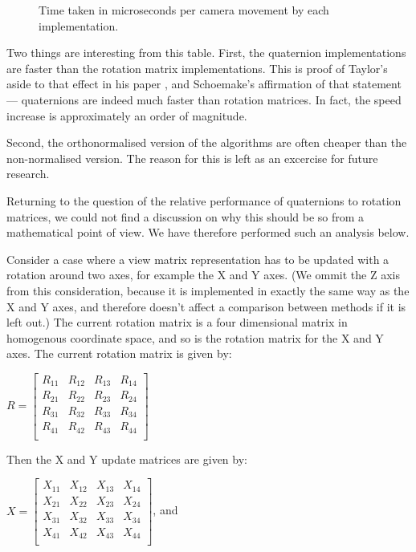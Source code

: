 \documentclass{acm_proc_article-sp}
\begin{document}
\begin{figure}
\caption{Time taken in microseconds per camera movement by each implementation.}
\label{fig:performance-table}
\end{figure}

Two things are interesting from this table.
First, the quaternion implementations are faster than the rotation matrix implementations.
This is proof of Taylor's aside to that effect in his paper \cite{taylor79}, and Schoemake's affirmation of that statement \cite{schoemake85} --- quaternions are indeed much faster than rotation matrices.
In fact, the speed increase is approximately an order of magnitude.

Second, the orthonormalised version of the algorithms are often cheaper than the non-normalised version.
The reason for this is left as an excercise for future research.

Returning to the question of the relative performance of quaternions to rotation matrices, we could not find a discussion on why this should be so from a mathematical point of view.
We have therefore performed such an analysis below.

Consider a case where a view matrix representation has to be updated with a rotation around two axes, for example the X and Y axes.
(We ommit the Z axis from this consideration, because it is implemented in exactly the same way as the X and Y axes, and therefore doesn't affect a comparison between methods if it is left out.)
The current rotation matrix is a four dimensional matrix in homogenous coordinate space, and so is the rotation matrix for the X and Y axes.
The current rotation matrix is given by:

$R = \left[ \begin{array}{cccc}
    R_{11} & R_{12} & R_{13} & R_{14} \\
    R_{21} & R_{22} & R_{23} & R_{24} \\
    R_{31} & R_{32} & R_{33} & R_{34} \\
    R_{41} & R_{42} & R_{43} & R_{44} \\
\end{array} \right]$

Then the X and Y update matrices are given by:

\vspace{0.5em}
$X = \left[ \begin{array}{cccc}
    X_{11} & X_{12} & X_{13} & X_{14} \\
    X_{21} & X_{22} & X_{23} & X_{24} \\
    X_{31} & X_{32} & X_{33} & X_{34} \\
    X_{41} & X_{42} & X_{43} & X_{44} \\
\end{array} \right]$, and
\end{document}
